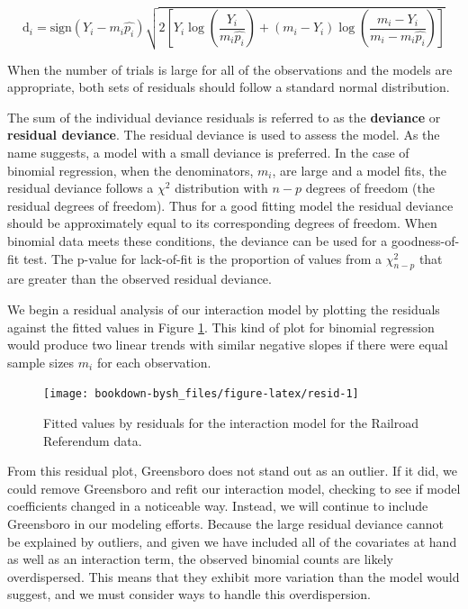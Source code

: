 \documentclass[
]{krantz}
\begin{document}
\begin{equation*}
\textrm{d}_i = 
\textrm{sign}(Y_i-m_i\hat{p_i})\sqrt{2[Y_i \log\left(\frac{Y_i}{m_i \hat{p_i}}\right)+
(m_i - Y_i) \log\left(\frac{m_i - Y_i}{m_i - m_i \hat{p_i}}\right)]}
\end{equation*}

When the number of trials is large for all of the observations and the models are appropriate, both sets of residuals should follow a standard normal distribution.

The sum of the individual deviance residuals is referred to as the \textbf{deviance} or \textbf{residual deviance}.  The residual deviance is used to assess the model. As the name suggests, a model with a small deviance is preferred. In the case of binomial regression, when the denominators, \(m_i\), are large and a model fits, the residual deviance follows a \(\chi^2\) distribution with \(n-p\) degrees of freedom (the residual degrees of freedom). Thus for a good fitting model the residual deviance should be approximately equal to its corresponding degrees of freedom. When binomial data meets these conditions, the deviance can be used for a goodness-of-fit test. The p-value for lack-of-fit is the proportion of values from a \(\chi_{n-p}^2\) that are greater than the observed residual deviance.

We begin a residual analysis of our interaction model by plotting the residuals against the fitted values in Figure \ref{fig:resid}. This kind of plot for binomial regression would produce two linear trends with similar negative slopes if there were equal sample sizes \(m_i\) for each observation.

\begin{figure}

{\centering \texttt{[image: bookdown-bysh\_files/figure-latex/resid-1]} 

}

\caption{Fitted values by residuals for the interaction model for the Railroad Referendum data.}\label{fig:resid}
\end{figure}

From this residual plot, Greensboro does not stand out as an outlier. If it did, we could remove Greensboro and refit our interaction model, checking to see if model coefficients changed in a noticeable way. Instead, we will continue to include Greensboro in our modeling efforts. Because the large residual deviance cannot be explained by outliers, and given we have included all of the covariates at hand as well as an interaction term, the observed binomial counts are likely overdispersed. This means that they exhibit more variation than the model would suggest, and we must consider ways to handle this overdispersion.
\end{document}
